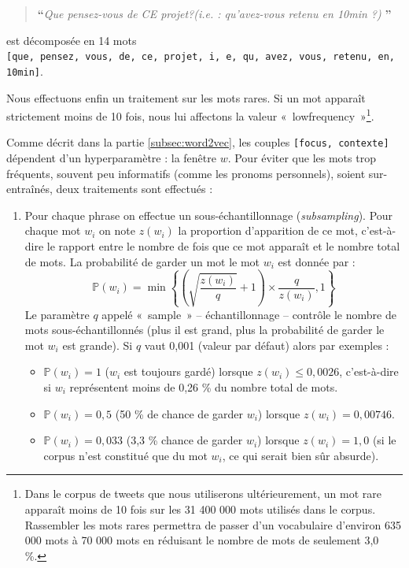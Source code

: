 \documentclass[11pt,french,french]{article}
\providecommand{\tightlist}{%
  \setlength{\parskip}{0pt}
  }
\let\rmarkdownfootnote\footnote%
\def\footnote{\protect\rmarkdownfootnote}
\begin{document}
\begin{quote}
\LARGE \textbf{``}\normalsize \emph{Que pensez-vous de CE projet?(i.e. : qu'avez-vous retenu en 10min ?)} \LARGE \textbf{''}\normalsize
\end{quote}

est décomposée en 14 mots \texttt{{[}que,\ pensez,\ vous,\ de,\ ce,\ projet,\ i,\ e,\ qu,\ avez,\ vous,\ retenu,\ en,\ 10min{]}}.

Nous effectuons enfin un traitement sur les mots rares. Si un mot apparaît strictement moins de 10 fois, nous lui affectons la valeur «~lowfrequency~»\footnote{Dans le corpus de tweets que nous utiliserons ultérieurement, un mot rare apparaît moins de 10 fois sur les 31 400 000 mots utilisés dans le corpus. Rassembler les mots rares permettra de passer d'un vocabulaire d'environ 635 000 mots à 70 000 mots en réduisant le nombre de mots de seulement 3,0 \%.}.

Comme décrit dans la partie \ref{subsec:word2vec}, les couples \texttt{{[}focus,\ contexte{]}} dépendent d'un hyperparamètre : la fenêtre \(w\). Pour éviter que les mots trop fréquents, souvent peu informatifs (comme les pronoms personnels), soient sur-entraînés, deux traitements sont effectués :

\begin{enumerate}
\def\labelenumi{\arabic{enumi}.}
\item
  Pour chaque phrase on effectue un sous-échantillonnage (\emph{subsampling}). Pour chaque mot \(w_i\) on note \(z(w_i)\) la proportion d'apparition de ce mot, c'est-à-dire le rapport entre le nombre de fois que ce mot apparaît et le nombre total de mots. La probabilité de garder un mot le mot \(w_i\) est donnée par :
  \[
  \mathbb P(w_i) = \min\left\{\left(\sqrt{\frac{z(w_i)}{q}} + 1 \right)
  \times
  \frac{q}{z(w_i)},1\right\}
  \]
  Le paramètre \(q\) appelé «~sample~» -- échantillonnage -- contrôle le nombre de mots sous-échantillonnés (plus il est grand, plus la probabilité de garder le mot \(w_i\) est grande). Si \(q\) vaut 0,001 (valeur par défaut) alors par exemples :

  \begin{itemize}
  \tightlist
  \item
    \(\mathbb P(w_i) = 1\) (\(w_i\) est toujours gardé) lorsque \(z(w_i)\leq 0,0026\), c'est-à-dire si \(w_i\) représentent moins de 0,26 \% du nombre total de mots.\\
  \item
    \(\mathbb P(w_i) = 0,5\) (50 \% de chance de garder \(w_i\)) lorsque \(z(w_i)=0,00746\).\\
  \item
    \(\mathbb P(w_i) = 0,033\) (3,3 \% chance de garder \(w_i\)) lorsque \(z(w_i)=1,0\) (si le corpus n'est constitué que du mot \(w_i\), ce qui serait bien sûr absurde).
  \end{itemize}
\end{enumerate}
\end{document}
